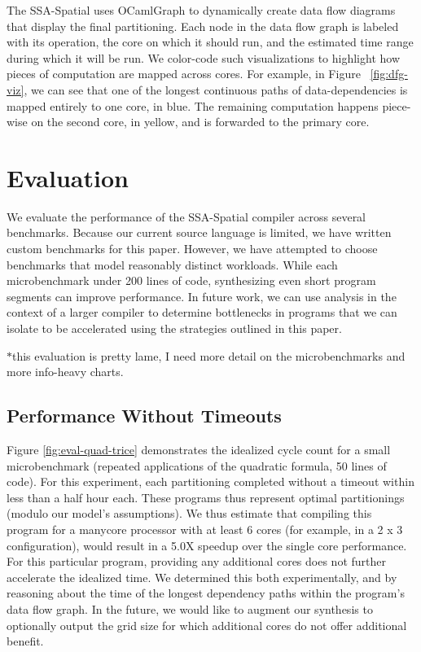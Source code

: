 \documentclass{sig-alternate-05-2015}
\newcommand{\note}{\color{red}$*$}
\begin{document}
The SSA-Spatial uses OCamlGraph to dynamically create data flow diagrams that display the final partitioning. Each node in the data flow graph is labeled with its operation, the core on which it should run, and the estimated time range during which it will be run. We color-code such visualizations to highlight how pieces of computation are mapped across cores. For example, in Figure ~\ref{fig:dfg-viz}, we can see that one of the longest continuous paths of data-dependencies is mapped entirely to one core, in blue. The remaining computation happens piece-wise on the second core, in yellow, and is forwarded to the primary core.

\section{Evaluation}
We evaluate the performance of the SSA-Spatial compiler across several benchmarks. Because our current source language is limited, we have written custom benchmarks for this paper. However, we have attempted to choose benchmarks that model reasonably distinct workloads. While each microbenchmark under 200 lines of code, synthesizing even short program segments can improve performance. In future work, we can use analysis in the context of a larger compiler to determine bottlenecks in programs that we can isolate to be accelerated using the strategies outlined in this paper.

{\note this evaluation is pretty lame, I need more detail on the microbenchmarks and more info-heavy charts. }

\subsection{Performance Without Timeouts}
Figure \ref{fig:eval-quad-trice} demonstrates the idealized cycle count for a small microbenchmark (repeated applications of the quadratic formula, 50 lines of code). For this experiment, each partitioning completed without a timeout within less than a half hour each. These programs thus represent optimal partitionings (modulo our model's assumptions). We thus estimate that compiling this program for a manycore processor with at least 6 cores (for example, in a 2 x 3 configuration), would result in a 5.0X speedup over the single core performance. For this particular program, providing any additional cores does not further accelerate the idealized time. We determined this both experimentally, and by reasoning about the time of the longest dependency paths within the program's data flow graph. In the future, we would like to augment our synthesis to optionally output the grid size for which additional cores do not offer additional benefit.
\end{document}
